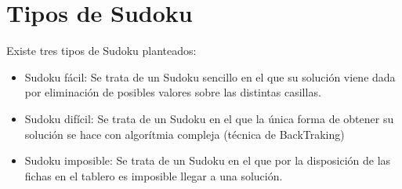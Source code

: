 \section{Tipos de Sudoku}

Existe tres tipos de Sudoku planteados:

\begin{itemize}
\item Sudoku fácil: Se trata de un Sudoku sencillo en el que su solución viene
dada por eliminación de posibles valores sobre las distintas casillas.
\item Sudoku difícil: Se trata de un Sudoku en el que la única forma de obtener
su solución se hace con algorítmia compleja (técnica de BackTraking)
\item Sudoku imposible: Se trata de un Sudoku en el que por la disposición de
las fichas en el tablero es imposible llegar a una solución.
\end{itemize}




